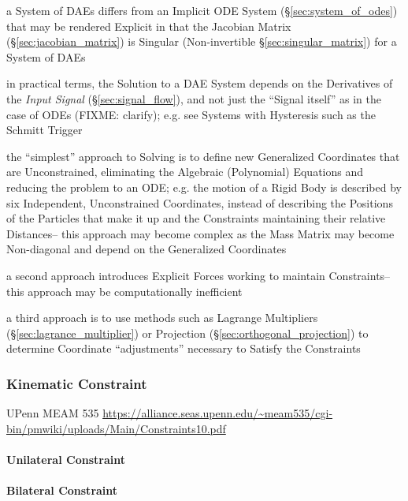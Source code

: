 \fist a System of DAEs differs from an Implicit ODE System
(\S\ref{sec:system_of_odes}) that may be rendered Explicit in that the Jacobian
Matrix (\S\ref{sec:jacobian_matrix}) is Singular (Non-invertible
\S\ref{sec:singular_matrix}) for a System of DAEs

in practical terms, the Solution to a DAE System depends on the Derivatives of
the \emph{Input Signal} (\S\ref{sec:signal_flow}), and not just the ``Signal
itself'' as in the case of ODEs (FIXME: clarify); e.g. see Systems with
Hysteresis such as the Schmitt Trigger

the ``simplest'' approach to Solving is to define new Generalized Coordinates
that are Unconstrained, eliminating the Algebraic (Polynomial) Equations and
reducing the problem to an ODE; e.g. the motion of a Rigid Body is described by
six Independent, Unconstrained Coordinates, instead of describing the Positions
of the Particles that make it up and the Constraints maintaining their relative
Distances-- this approach may become complex as the Mass Matrix may become
Non-diagonal and depend on the Generalized Coordinates

a second approach introduces Explicit Forces working to maintain Constraints--
this approach may be computationally inefficient

a third approach is to use methods such as Lagrange Multipliers
(\S\ref{sec:lagrance_multiplier}) or Projection
(\S\ref{sec:orthogonal_projection}) to determine Coordinate ``adjustments''
necessary to Satisfy the Constraints



\subsubsection{Kinematic Constraint}\label{sec:kinematic_constraint}


UPenn MEAM 535
\url{https://alliance.seas.upenn.edu/~meam535/cgi-bin/pmwiki/uploads/Main/Constraints10.pdf}



\paragraph{Unilateral Constraint}\label{sec:unilateral_constraint}\hfill

\paragraph{Bilateral Constraint}\label{sec:bilateral_constraint}\hfill

